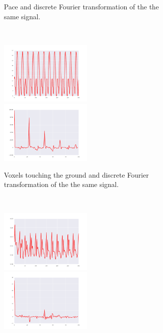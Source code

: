 \documentclass{sig-alternate}
\begin{document}
\begin{figure}[t!]
\begin{subfigure}[b]{0.24\textwidth}
\caption{Pace and discrete Fourier transformation of the the same signal.}
\end{subfigure}~
\begin{subfigure}[b]{0.25\textwidth}
\centering
\includegraphics[width=0.49\textwidth]{../Figures/Behaviors/vtg.pdf}~
\includegraphics[width=0.49\textwidth]{../Figures/Behaviors/vtgdft.pdf}
\caption{Voxels touching the ground and discrete Fourier transformation of the the same signal.}
\end{subfigure}\\
\begin{subfigure}[b]{0.25\textwidth}
\centering
\includegraphics[width=0.49\textwidth]{../Figures/Behaviors/pr.pdf}~
\includegraphics[width=0.49\textwidth]{../Figures/Behaviors/prdft.pdf}

\end{subfigure}
\end{figure}
\end{document}
